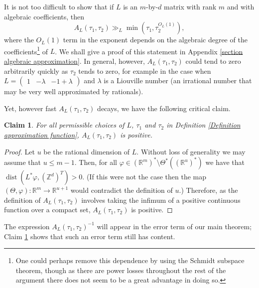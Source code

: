 \documentclass[12pt,a4paper,twoside,reqno]{amsart}
\newtheorem{Claim}[Theorem]{Claim}
\newcommand{\dist}{\operatorname{dist}}
\numberwithin{equation}{section}
\begin{document}
It is not too difficult to show that if $L$ is an $m$-by-$d$ matrix with rank $m$ and with algebraic coefficients, then \begin{equation}
\label{approximation function in the algebraic case}
A_L(\tau_1,\tau_2) \gg_L \min(\tau_1,\tau_2^{O_L(1)}),
\end{equation} where the $O_L(1)$ term in the exponent depends on the algebraic degree of the coefficients\footnote{One could perhaps remove this dependence by using the Schmidt subspace theorem, though as there are power losses throughout the rest of the argument there does not seem to be a great advantage in doing so.} of $L$. We shall give a proof of this statement in Appendix \ref{section algebraic approximation}. In general, however, $A_L(\tau_1,\tau_2)$ could tend to zero arbitrarily quickly as $\tau_2$ tends to zero, for example in the case when $L = \left(\begin{matrix} 1 & -\lambda  & -1 + \lambda\end{matrix}\right)$ and $\lambda$ is a Liouville number (an irrational number that may be very well approximated by rationals).



Yet, however fast $A_L(\tau_1,\tau_2)$ decays, we have the following critical claim. 
\begin{Claim}
\label{claim approximation function is positive}
For all permissible choices of $L$, $\tau_1$ and $\tau_2$ in Definition \ref{Definition approximation function}, $A_L(\tau_1,\tau_2)$ is positive. 
\end{Claim}
\begin{proof}
Let $u$ be the rational dimension of $L$. Without loss of generality we may assume that $u\leqslant m-1$. Then, for all $\varphi \in (\mathbb{R}^m)^* \setminus \Theta^*((\mathbb{R}^u)^*)$ we have that $\dist (L^* \varphi, (\mathbb{Z}^d)^T )> 0$. (If this were not the case then the map $(\Theta,\varphi):\mathbb{R}^m \longrightarrow \mathbb{R}^{u+1}$ would contradict the definition of $u$.) Therefore, as the definition of $A_L(\tau_1,\tau_2)$ involves taking the infimum of a positive continuous function over a compact set, $A_L(\tau_1,\tau_2)$ is positive.
\end{proof}
\noindent The expression $A_L(\tau_1,\tau_2)^{-1}$ will appear in the error term of our main theorem; Claim \ref{claim approximation function is positive} shows that such an error term still has content. \\
\end{document}
